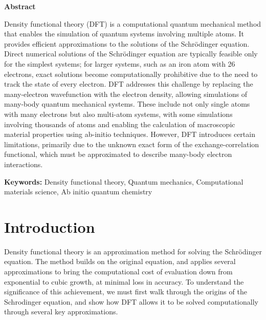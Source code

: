 
\DeclareSIUnit{}





\pagebreak

\begin{center}
  \textbf{Abstract}
\end{center}

\begin{spacing}{1.15}
  Density functional theory (DFT) is a computational quantum
  mechanical method that enables
  the simulation of quantum systems involving multiple atoms. It
  provides efficient
  approximations to the solutions of the Schr\"odinger equation.
  Direct numerical solutions
  of the Schr\"odinger equation are typically feasible only for the
  simplest systems; for
  larger systems, such as an iron atom with 26 electrons, exact solutions become
  computationally prohibitive due to the need to track the state of
  every electron.
  DFT addresses this challenge by replacing the many-electron
  wavefunction with the
  electron density, allowing simulations of many-body quantum
  mechanical systems.
  These include not only single atoms with many electrons but also
  multi-atom systems,
  with some simulations involving thousands of atoms and enabling the
  calculation of
  macroscopic material properties using ab-initio techniques.
  However, DFT introduces
  certain limitations, primarily due to the unknown exact form of the
  exchange-correlation
  functional, which must be approximated to describe many-body
  electron interactions.
\end{spacing}

\vspace{0.5cm}
\noindent\textbf{Keywords:} Density functional theory, Quantum
mechanics, Computational materials science, Ab initio quantum chemistry

\pagebreak

\section{Introduction}


Density functional theory is an approximation method for solving the
Schr\"odinger equation. The method builds on the original equation, and
applies several approximations to bring the computational cost of evaluation
down from exponential to cubic growth, at minimal loss in accuracy.
To understand
the significance of this achievement, we must first walk through the origins of
the Schrodinger equation, and show how DFT allows it to be solved
computationally
through several key approximations. \par

